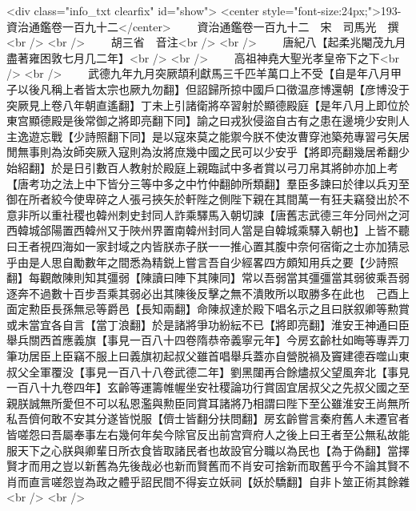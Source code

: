 <div class="info_txt clearfix" id="show">
<center style="font-size:24px;">193-資治通鑑卷一百九十二</center>
  　　資治通鑑卷一百九十二　宋　司馬光　撰<br />
<br />
　　胡三省　音注<br />
<br />
　　唐紀八【起柔兆閹茂九月盡著雍困敦七月几二年】<br />
<br />
　　高祖神堯大聖光孝皇帝下之下<br />
<br />
　　武德九年九月突厥頡利獻馬三千匹羊萬口上不受【自是年八月甲子以後凡稱上者皆太宗也厥九勿翻】但詔歸所掠中國戶口徵温彦博還朝【彦博没于突厥見上卷八年朝直遙翻】丁未上引諸衛將卒習射於顯德殿庭【是年八月上即位於東宫顯德殿是後常御之將即亮翻下同】諭之曰戎狄侵盜自古有之患在邊境少安則人主逸遊忘戰【少詩照翻下同】是以寇來莫之能禦今朕不使汝曹穿池築苑專習弓矢居閒無事則為汝師突厥入寇則為汝將庶幾中國之民可以少安乎【將即亮翻幾居希翻少始紹翻】於是日引數百人教射於殿庭上親臨試中多者賞以弓刀帛其將帥亦加上考【唐考功之法上中下皆分三等中多之中竹仲翻帥所類翻】羣臣多諫曰於律以兵刃至御在所者絞今使卑碎之人張弓挾矢於軒陛之側陛下親在其間萬一有狂夫竊發出於不意非所以重社稷也韓州刺史封同人詐乘驛馬入朝切諫【唐舊志武德三年分同州之河西韓城郃陽置西韓州又于陜州界置南韓州封同人當是自韓城乘驛入朝也】上皆不聽曰王者視四海如一家封域之内皆朕赤子朕一一推心置其腹中奈何宿衛之士亦加猜忌乎由是人思自勵數年之間悉為精鋭上嘗言吾自少經畧四方頗知用兵之要【少詩照翻】每觀敵陳則知其彊弱【陳讀曰陣下其陳同】常以吾弱當其彊彊當其弱彼乘吾弱逐奔不過數十百步吾乘其弱必出其陳後反擊之無不潰敗所以取勝多在此也　己酉上面定勲臣長孫無忌等爵邑【長知兩翻】命陳叔達於殿下唱名示之且曰朕叙卿等勲賞或未當宜各自言【當丁浪翻】於是諸將爭功紛紜不已【將即亮翻】淮安王神通曰臣舉兵關西首應義旗【事見一百八十四卷隋恭帝義寧元年】今房玄齡杜如晦等專弄刀筆功居臣上臣竊不服上曰義旗初起叔父雖首唱舉兵蓋亦自營脱禍及竇建德吞噬山東叔父全軍覆没【事見一百八十八卷武德二年】劉黑闥再合餘燼叔父望風奔北【事見一百八十九卷四年】玄齡等運籌帷幄坐安社稷論功行賞固宜居叔父之先叔父國之至親朕誠無所愛但不可以私恩濫與勲臣同賞耳諸將乃相謂曰陛下至公雖淮安王尚無所私吾儕何敢不安其分遂皆悦服【儕士皆翻分扶問翻】房玄齡嘗言秦府舊人未遷官者皆嗟怨曰吾屬奉事左右幾何年矣今除官反出前宫齊府人之後上曰王者至公無私故能服天下之心朕與卿輩日所衣食皆取諸民者也故設官分職以為民也【為于偽翻】當擇賢才而用之豈以新舊為先後哉必也新而賢舊而不肖安可捨新而取舊乎今不論其賢不肖而直言嗟怨豈為政之體乎詔民間不得妄立妖祠【妖於驕翻】自非卜筮正術其餘雜<br />
<br />

